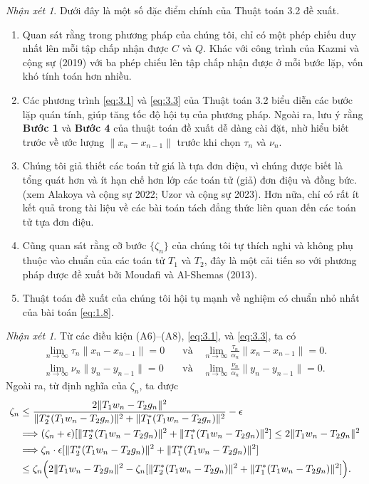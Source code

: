 \documentclass[11pt,a4paper]{article}
\theoremstyle{plain}
\theoremstyle{definition}
\theoremstyle{remark}
\newtheorem{remark}[theorem]{Nhận xét}
\numberwithin{equation}{section}
\newcommand{\nm}[1]{\lVert #1\rVert}
\begin{document}
\begin{remark}
Dưới đây là một số đặc điểm chính của Thuật toán 3.2 đề xuất.
\begin{enumerate}[label=(\roman*)]
\item Quan sát rằng trong phương pháp của chúng tôi, chỉ có một phép chiếu duy nhất lên mỗi tập chấp nhận được $C$ và $Q$. Khác với công trình của Kazmi và cộng sự (2019) với ba phép chiếu lên tập chấp nhận được ở mỗi bước lặp, vốn khó tính toán hơn nhiều.
\item Các phương trình \eqref{eq:3.1} và \eqref{eq:3.3} của Thuật toán 3.2 biểu diễn các bước lặp quán tính, giúp tăng tốc độ hội tụ của phương pháp. Ngoài ra, lưu ý rằng \textbf{Bước 1} và \textbf{Bước 4} của thuật toán đề xuất dễ dàng cài đặt, nhờ hiểu biết trước về ước lượng $\nm{x_n-x_{n-1}}$ trước khi chọn $\tau_n$ và $\nu_n$.
\item Chúng tôi giả thiết các toán tử giá là tựa đơn điệu, vì chúng được biết là tổng quát hơn và ít hạn chế hơn lớp các toán tử (giả) đơn điệu và đồng bức. (xem Alakoya và cộng sự 2022; Uzor và cộng sự 2023). Hơn nữa, chỉ có rất ít kết quả trong tài liệu về các bài toán tách đẳng thức liên quan đến các toán tử tựa đơn điệu.
\item Cũng quan sát rằng cỡ bước $\{\zeta_n\}$ của chúng tôi tự thích nghi và không phụ thuộc vào chuẩn của các toán tử $T_1$ và $T_2$, đây là một cải tiến so với phương pháp được đề xuất bởi Moudafi và Al-Shemas (2013).
\item Thuật toán đề xuất của chúng tôi hội tụ mạnh về nghiệm có chuẩn nhỏ nhất của bài toán \eqref{eq:1.8}.
\end{enumerate}
\end{remark}

\begin{remark}\label{rem:3.4}
Từ các điều kiện (A6)--(A8), \eqref{eq:3.1}, và \eqref{eq:3.3}, ta có
\begin{align}
\lim_{n\to\infty}\tau_n\nm{x_n-x_{n-1}}=0 &\quad\text{và}\quad \lim_{n\to\infty}\frac{\tau_n}{\alpha_n}\nm{x_n-x_{n-1}}=0. \label{eq:3.5}\\
\lim_{n\to\infty}\nu_n\nm{y_n-y_{n-1}}=0 &\quad\text{và}\quad \lim_{n\to\infty}\frac{\nu_n}{\alpha_n}\nm{y_n-y_{n-1}}=0. \label{eq:3.6}
\end{align}
Ngoài ra, từ định nghĩa của $\zeta_n$, ta được
\begin{align}
\zeta_n &\le \frac{2\nm{T_1w_n-T_2g_n}^2}{\nm{T_2^{*}(T_1w_n-T_2g_n)}^2+\nm{T_1^{*}(T_1w_n-T_2g_n)}^2}-\epsilon\notag\\
&\Longrightarrow (\zeta_n+\epsilon)[\nm{T_2^{*}(T_1w_n-T_2g_n)}^2+\nm{T_1^{*}(T_1w_n-T_2g_n)}^2]\le 2\nm{T_1w_n-T_2g_n}^2\notag\\
&\Longrightarrow \zeta_n\cdot\epsilon[\nm{T_2^{*}(T_1w_n-T_2g_n)}^2+\nm{T_1^{*}(T_1w_n-T_2g_n)}^2]\notag\\
&\le \zeta_n\Bigl(2\nm{T_1w_n-T_2g_n}^2-\zeta_n[\nm{T_2^{*}(T_1w_n-T_2g_n)}^2+\nm{T_1^{*}(T_1w_n-T_2g_n)}^2]\Bigr). \label{eq:3.7}
\end{align}
\end{remark}
\end{document}

